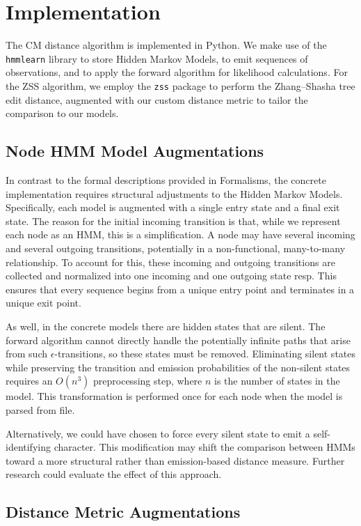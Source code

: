 \section{Implementation}
\label{sec:implementation}

The CM distance algorithm is implemented in Python. We make use
of the \texttt{hmmlearn} library to store Hidden Markov Models, to emit sequences of
observations, and to apply the forward algorithm for likelihood calculations. For the
ZSS algorithm, we employ the \texttt{zss} package to perform the Zhang--Shasha tree
edit distance, augmented with our custom distance metric to tailor the comparison to
our models.

\subsection{Node HMM Model Augmentations}
In contrast to the formal descriptions provided in Formalisms, the concrete implementation
requires structural adjustments to the Hidden Markov Models. Specifically, each model
is augmented with a single entry state and a final exit state. The reason for the
initial incoming transition is that, while we represent each node
as an HMM, this is a simplification. A node may have several incoming and several outgoing transitions, potentially in 
a non-functional, many-to-many relationship. To account for this, 
these incoming and outgoing transitions are
collected and normalized into one incoming and one outgoing state resp. This ensures that every sequence begins from a
unique entry point and terminates in a unique exit point. 

As well, in the concrete models there are hidden states that are silent. The forward
algorithm cannot directly handle the potentially infinite paths that arise from such
$\epsilon$-transitions, so these states must be removed. Eliminating silent states while
preserving the transition and emission probabilities of the non-silent states requires
an $O(n^3)$ preprocessing step, where $n$ is the number of states in the model. This
transformation is performed once for each node when the model is parsed from file. 

Alternatively, we could have chosen 
to force every silent state to emit a self-identifying
character. This modification may shift the comparison between HMMs toward
a more structural rather than emission-based distance measure. Further research could
evaluate the effect of this approach. 

\subsection{Distance Metric Augmentations}

